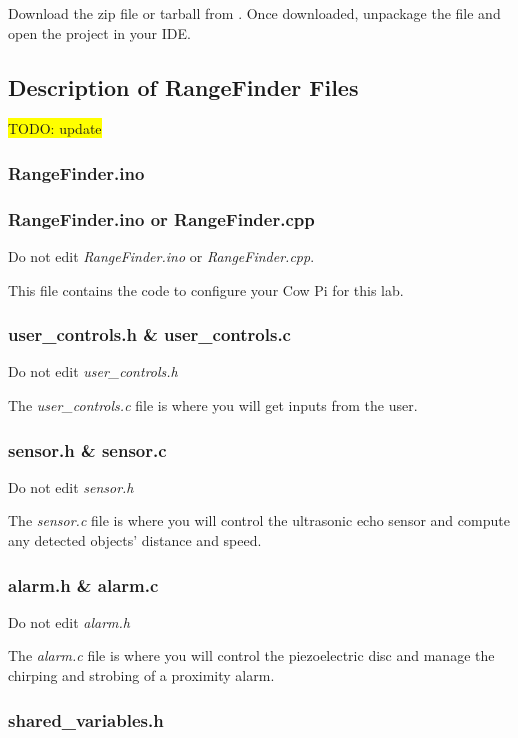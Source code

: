 Download the zip file or tarball from \filesource.
Once downloaded, unpackage the file and open the project in your IDE\@.

\subsection{Description of RangeFinder Files}

\colorbox{yellow}{TODO: update}

\subsubsection{RangeFinder.ino}
\subsubsection{RangeFinder.ino or RangeFinder.cpp}

Do not edit \textit{RangeFinder.ino} or \textit{RangeFinder.cpp}.

This file contains the code to configure your Cow Pi for this lab.

\subsubsection{user\_controls.h \& user\_controls.c}

Do not edit \textit{user\_controls.h}

The \textit{user\_controls.c} file is where you will get inputs from the user.

\subsubsection{sensor.h \& sensor.c}

Do not edit \textit{sensor.h}

The \textit{sensor.c} file is where you will control the ultrasonic echo sensor and compute any detected objects' distance and speed.

\subsubsection{alarm.h \& alarm.c}

Do not edit \textit{alarm.h}

The \textit{alarm.c} file is where you will control the piezoelectric disc and manage the chirping and strobing of a proximity alarm.

\subsubsection{shared\_variables.h}

